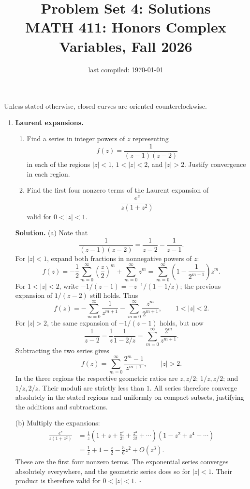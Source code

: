 \documentclass[12pt,reqno]{amsart}
\title{Problem Set 4: Solutions \\ MATH 411: Honors Complex Variables, Fall 2026}
\date{last compiled: \today}
\newenvironment{solution}
  {\par\smallskip\begin{tcolorbox}[breakable,enhanced,colback=solblue,colframe=solframe,
   boxrule=0.5pt,arc=2pt,left=6pt,right=6pt,top=4pt,bottom=4pt]\setlength{\abovedisplayskip}{7pt}\setlength{\belowdisplayskip}{7pt}\noindent\textbf{Solution.}}
  {\hfill$\square$\end{tcolorbox}\par\medskip}
\begin{document}
\maketitle

Unless stated otherwise, closed curves are oriented counterclockwise.

\begin{enumerate}

\item \textbf{Laurent expansions.}
\begin{enumerate}
\item Find a series in integer powers of $z$ representing
\[
 f(z)=\frac{1}{(z-1)(z-2)}
\]
in each of the regions $|z|<1$, $1<|z|<2$, and $|z|>2$.
Justify convergence in each region.
\item Find the first four nonzero terms of the Laurent expansion of
\[
 \frac{e^z}{z(1+z^2)}
\]
valid for $0<|z|<1$.
\end{enumerate}


\begin{solution}
\noindent (a) Note that
\[
\frac{1}{(z-1)(z-2)}=\frac{1}{z-2}-\frac{1}{z-1}.
\]
For $|z|<1$, expand both fractions in nonnegative powers of $z$:
\[
\boxed{f(z)=-\frac12\sum_{m=0}^\infty\left(\frac z2\right)^m
+\sum_{m=0}^\infty z^m
=\sum_{m=0}^\infty\left(1-\frac{1}{2^{m+1}}\right)z^m.}
\]
For $1<|z|<2$, write $-1/(z-1)=-z^{-1}/(1-1/z)$; the previous
expansion of $1/(z-2)$ still holds. Thus
\[
\boxed{f(z)=-\sum_{m=0}^\infty\frac{1}{z^{m+1}}
-\sum_{m=0}^\infty\frac{z^m}{2^{m+1}},\qquad 1<|z|<2.}
\]
For $|z|>2$, the same expansion of $-1/(z-1)$ holds, but now
\[
\frac{1}{z-2}=\frac1z\frac{1}{1-2/z}
=\sum_{m=0}^\infty\frac{2^m}{z^{m+1}}.
\]
Subtracting the two series gives
\[
\boxed{f(z)=\sum_{m=0}^\infty\frac{2^m-1}{z^{m+1}},\qquad |z|>2.}
\]
In the three regions the respective geometric ratios are $z,z/2$;
$1/z,z/2$; and $1/z,2/z$. Their moduli are strictly less than $1$.
All series therefore converge absolutely in the stated regions and
uniformly on compact subsets, justifying the additions and subtractions.

\medskip
\noindent (b) Multiply the expansions:
\begin{align*}
\frac{e^z}{z(1+z^2)}
&=\frac1z\left(1+z+\frac{z^2}{2!}+\frac{z^3}{3!}+\cdots\right)
          \left(1-z^2+z^4-\cdots\right)\\
&=\boxed{\frac1z+1-\frac z2-\frac56z^2+O(z^3).}
\end{align*}
These are the first four nonzero terms. The exponential series converges
absolutely everywhere, and the geometric series does so for $|z|<1$.
Their product is therefore valid for $0<|z|<1$.
\end{solution}


\end{enumerate}
\end{document}
